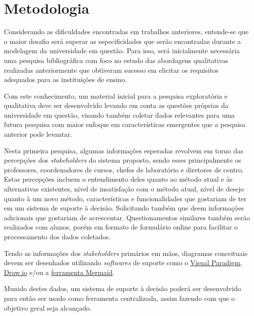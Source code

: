 \chapter{Metodologia}

Considerando as dificuldades encontradas em trabalhos anteriores, entende-se que o maior desafio será superar as especificidades que serão encontradas durante a modelagem da universidade em questão. Para isso, será inicialmente necessária uma pesquisa bibliográfica com foco no estudo das abordagens qualitativas realizadas anteriormente que obtiveram sucesso em elicitar os requisitos adequados para as instituições de ensino.


Com este conhecimento, um material inicial para a pesquisa exploratória e qualitativa deve ser desenvolvido levando em conta as questões próprias da universidade em questão, visando também coletar dados relevantes para uma futura pesquisa com maior enfoque em características emergentes que a pesquisa anterior pode levantar.

Nesta primeira pesquisa, algumas informações esperadas revolvem em torno das percepções dos \textit{stakeholders} do sistema proposto, sendo esses principalmente os professores, coordenadores de cursos, chefes de laboratório e diretores de centro. Estas percepções incluem o entendimento deles quanto ao método atual e às alternativas existentes, nível de insatisfação com o método atual, nível de desejo quanto à um novo método, características e funcionalidades que gostariam de ter em um sistema de suporte à decisão. Solicitando também que deem informações adicionais que gostariam de acrescentar. Questionamentos similares também serão realizados com alunos, porém em formato de formulário online para facilitar o processamento dos dados coletados.

Tendo as informações dos \textit{stakeholders} primários em mãos, diagramas conceituais devem ser desenhados utilizando \textit{softwares} de suporte como o \href{https://www.visual-paradigm.com/}{Visual Paradigm}, \href{drawio.com}{Draw.io} e/ou a \href{https://mermaid.js.org/}{ferramenta Mermaid}.

Munido destes dados, um sistema de suporte à decisão poderá ser desenvolvido para então ser usado como ferramenta centralizada, assim fazendo com que o objetivo geral seja alcançado.
